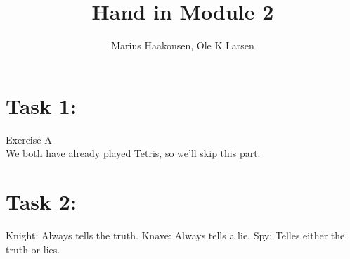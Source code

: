 \documentclass[11pt]{amsart}
\title{Hand in Module 2}
\author{Marius Haakonsen, Ole K Larsen}
\begin{document}
\maketitle

\section{Task 1:}

Exercise A  \\
We both have already played Tetris, so we'll skip this part.  \\





\section{Task 2:}

Knight: Always tells the truth.
Knave: Always tells a lie.
Spy: Telles either the truth or lies.
\end{document}
